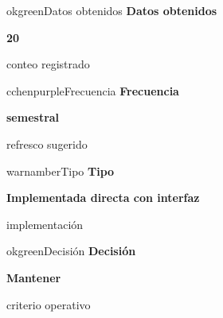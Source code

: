 \documentclass[9pt,a4paper]{extarticle}
\begin{document}
\vspace{0.04cm}
\begin{minipage}{0.24\textwidth}
\begin{metricbox}{okgreen}{Datos obtenidos}
{\large\bfseries Datos obtenidos}\par
{\Large\bfseries 20}\par
{\normalsize conteo registrado}
\end{metricbox}
\end{minipage}\hfill
\begin{minipage}{0.24\textwidth}
\begin{metricbox}{cchenpurple}{Frecuencia}
{\large\bfseries Frecuencia}\par
{\large\bfseries semestral}\par
{\normalsize refresco sugerido}
\end{metricbox}
\end{minipage}\hfill
\begin{minipage}{0.24\textwidth}
\begin{metricbox}{warnamber}{Tipo}
{\large\bfseries Tipo}\par
{\normalsize\bfseries Implementada directa con interfaz}\par
{\normalsize implementación}
\end{metricbox}
\end{minipage}\hfill
\begin{minipage}{0.24\textwidth}
\begin{metricbox}{okgreen}{Decisión}
{\large\bfseries Decisión}\par
{\normalsize\bfseries Mantener}\par
{\normalsize criterio operativo}
\end{metricbox}
\end{minipage}
\end{document}
